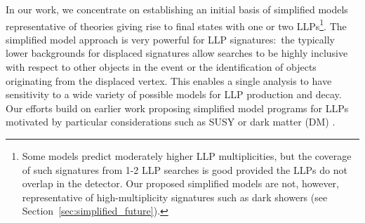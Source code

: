 In our work, we concentrate on establishing an initial basis of simplified models representative of theories giving rise to final states with one or two LLPs\footnote{Some models predict moderately higher LLP multiplicities, but the coverage of such signatures from 1-2 LLP searches is good provided the LLPs do not overlap in the detector. Our proposed simplified models are not, however, representative of high-multiplicity signatures such as dark showers (see Section~\ref{sec:simplified_future}).}.  The simplified model approach is very powerful for LLP signatures:~the typically lower backgrounds for displaced signatures allow searches to be highly inclusive with respect to other objects in the event or the identification of objects originating from the displaced vertex. This enables a single analysis to have sensitivity to a wide variety of possible models for LLP production and decay. Our efforts build on earlier work proposing simplified model programs for LLPs motivated by particular considerations such as SUSY or dark matter (DM) \cite{Heisig:2012zq,Liu:2015bma,Heisig:2015yla,Khoze:2017ixx,Mahbubani:2017gjh,Buchmueller:2017uqu}. 

